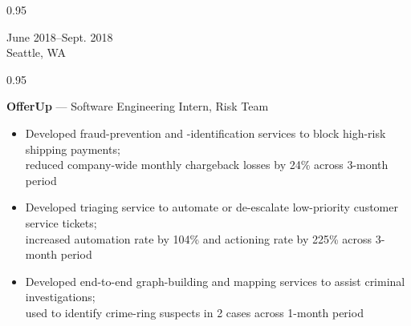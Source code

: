 \documentclass[a4paper,9pt]{article}
\newcommand{\mainMarginBottom}{\vspace*{2.5pt}}
\newcommand{\newLine}{\\}
\newcommand{\doubleColumnGap}{\hspace{4mm}}
\newcommand{\withinSectionMarginBetween}{\vspace{-2.75ex}}
\newcommand{\mainLineSpacing}{0.95}
\begin{document}
\begin{minipage}[t]{0.20\linewidth}
  \begin{small}
    \begin{spacing}\mainLineSpacing{}
      \begin{flushright}
        June 2018--Sept. 2018
        \newLine{}
        \mainMarginBottom{}
        Seattle, WA
      \end{flushright}
    \end{spacing}
  \end{small}
\end{minipage}
\doubleColumnGap{}
\begin{minipage}[t]{0.75\linewidth}
  \begin{small}
    \begin{spacing}\mainLineSpacing{}
      \begin{flushleft}
        \textbf{OfferUp} --- Software Engineering Intern, Risk Team
        \mainMarginBottom{}
        \begin{itemize}[itemsep=1pt,topsep=0pt,leftmargin=*]
          \item Developed fraud-prevention and -identification services to block high-risk shipping payments;\\ reduced company-wide monthly chargeback losses by 24\% across 3-month period
          \item Developed triaging service to automate or de-escalate low-priority customer service tickets;\\ increased automation rate by 104\% and actioning rate by 225\% across 3-month period
          \item Developed end-to-end graph-building and mapping services to assist criminal investigations;\\ used to identify crime-ring suspects in 2 cases across 1-month period
        \end{itemize}
      \end{flushleft}
    \end{spacing}
  \end{small}
\end{minipage}

\withinSectionMarginBetween{}
\end{document}
